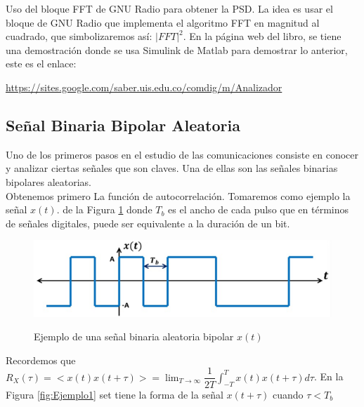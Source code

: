 Uso del bloque FFT de GNU Radio para obtener la PSD. La idea es usar el bloque de GNU Radio que implementa el algoritmo FFT en magnitud al cuadrado, que simbolizaremos así:
$|FFT|^{2}$. En la página web del libro, se tiene una demostración donde se usa Simulink de Matlab para demostrar lo anterior, este es el enlace:

\begin{center}
\url{https://sites.google.com/saber.uis.edu.co/comdig/m/Analizador}
\end{center}

\subsection{Señal Binaria Bipolar Aleatoria}
Uno de los primeros pasos en el estudio de las comunicaciones consiste en conocer y analizar ciertas señales que son claves. Una de ellas son las señales binarias bipolares aleatorias.\\ 
Obtenemos primero La función de autocorrelación. Tomaremos como ejemplo la señal $x(t)$. de la Figura \ref{fig:Ejemplo} donde $T_b$ es el ancho de cada pulso que en términos de señales digitales, puede ser equivalente a la duración de un bit.

\begin{figure}[h!]
	\captionsetup{justification = raggedright, singlelinecheck = false}
	\caption{Ejemplo de una señal binaria aleatoria bipolar $x(t)$ } 
	\centering
	\includegraphics[scale=0.9]{Imagenes/Ejemplo.png}
	\label{fig:Ejemplo}
\end{figure}

Recordemos que $ R_{X}(\tau) = <x(t)x(t + \tau)> = \lim_{T \to \infty} \dfrac{1}{2T} \int_{-T}^{T} x(t) x(t + \tau ) d\tau $. En la Figura \ref{fig:Ejemplo1} set tiene la forma de la señal $x(t+\tau)$ cuando $\tau<T_b$\\

